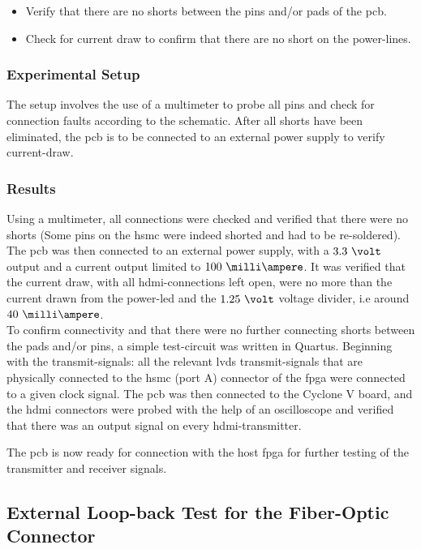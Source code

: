 \documentclass[main.tex]{subfiles}
\begin{document}
\begin{itemize}\setlength{\itemsep}{10pt}
\item Verify that there are no shorts between the pins and/or pads of the \gls{pcb}. 
\item Check for current draw to confirm that there are no short on the power-lines.
\end{itemize}

\subsubsection{Experimental Setup}

The setup involves the use of a multimeter to probe all pins and check for connection faults according to the schematic. After all shorts have been eliminated, the \gls{pcb} is to be connected to an external power supply to verify current-draw. 

\subsubsection{Results}
 Using a multimeter, all connections were checked and verified that there were no shorts (Some pins on the \gls{hsmc} were indeed shorted and had to be re-soldered). The \gls{pcb} was then connected to an external power supply, with a $3.3~\volt$ output and a current output limited to $100~\milli\ampere$. It was verified that the current draw, with all \gls{hdmi}-connections left open, were no more than the current drawn from the power-\acrshort{led} and the $1.25~\volt$ voltage divider, i.e around $40~\milli\ampere$. \\

To confirm connectivity and that there were no further connecting shorts between the pads and/or pins, a simple test-circuit was written in Quartus. Beginning with the transmit-signals: all the relevant \gls{lvds} transmit-signals that are physically connected to the \gls{hsmc} (port A) connector of the \gls{fpga} were connected to a given clock signal. The \gls{pcb} was then connected to the Cyclone V board, and the \gls{hdmi} connectors were probed with the help of an oscilloscope and verified that there was an output signal on every \gls{hdmi}-transmitter. 

The \gls{pcb} is now ready for connection with the host \gls{fpga} for further testing of the transmitter and receiver signals. 

\subsection{External Loop-back Test for the Fiber-Optic Connector} \label{sec:exlooptest}
\end{document}
